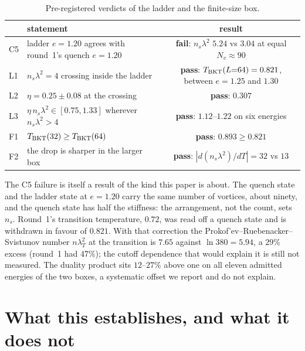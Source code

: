\documentclass[11pt,a4paper]{article}
\begin{document}
\begin{table}[h]\centering\small
\begin{tabular}{llc}
\toprule
& statement & result\\
\midrule
C5 & ladder $e=1.20$ agrees with round~1's quench $e=1.20$ & \textbf{fail}: $n_s\lambda^2$ $5.24$ vs $3.04$ at equal $N_v\approx90$\\
L1 & $n_s\lambda^2=4$ crossing inside the ladder & \textbf{pass}: $T_{\rm BKT}(L{=}64)=0.821$, between $e=1.25$ and $1.30$\\
L2 & $\eta=0.25\pm0.08$ at the crossing & \textbf{pass}: $0.307$\\
L3 & $\eta\,n_s\lambda^2\in[0.75,1.33]$ wherever $n_s\lambda^2>4$ & \textbf{pass}: $1.12$--$1.22$ on six energies\\
F1 & $T_{\rm BKT}(32)\ge T_{\rm BKT}(64)$ & \textbf{pass}: $0.893\ge0.821$\\
F2 & the drop is sharper in the larger box & \textbf{pass}: $|d(n_s\lambda^2)/dT|=32$ vs $13$\\
\bottomrule
\end{tabular}
\caption{Pre-registered verdicts of the ladder and the finite-size box.}
\end{table}

The C5 failure is itself a result of the kind this paper is about. The quench state and the ladder
state at $e=1.20$ carry the same number of vortices, about ninety, and the quench state has half the
stiffness: the arrangement, not the count, sets $n_s$. Round~1's transition temperature, $0.72$,
was read off a quench state and is withdrawn in favour of $0.821$. With that correction the
Prokof'ev--Ruebenacker--Svistunov number $n\lambda_T^2$ at the transition is $7.65$ against
$\ln380=5.94$, a $29\%$ excess (round~1 had $47\%$); the cutoff dependence that would explain it is
still not measured. The duality product sits $12$--$27\%$ above one on all eleven admitted energies
of the two boxes, a systematic offset we report and do not explain.

\section{What this establishes, and what it does not}
\end{document}
